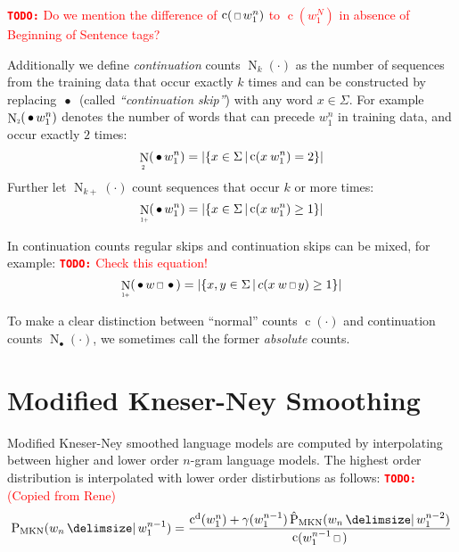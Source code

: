 \documentclass[m,bachelor,binding]{WeSTthesis}
\newcommand*{\Scale}[2][4]{\scalebox{#1}{$#2$}}%
\newcommand{\DummyArg}{\cdot}
\newcommand{\DummyIndex}{\bullet}
\newcommand{\Cardinality}[1]{\left|#1\right|}
\DeclareMathOperator{\Count}{c}
\DeclareMathOperator{\ContCount}{N}
\newcommand{\ContCountIp}  {\ContCount_{\Scale[0.5]{1+}}}
\newcommand{\ContCountII}  {\ContCount_{\Scale[0.5]{2 }}}
\newcommand{\Skp}{\ensuremath{\,\Scale[0.7]{\square}\,}}
\newcommand{\WSkp}{\ensuremath{\,\bullet\,}}
\newenvironment{draft}{\color{draftcolor}}{}
\newcommand{\todo}[1]{\textcolor{red}{{\footnotesize\textbf{\texttt{TODO:}}} #1}}
\begin{document}
\todo{Do we mention the difference of $\Count(\Skp w_1^n)$ to $\Count(w_1^N)$
in absence of Beginning of Sentence tags?}

Additionally we define \emph{continuation} counts $\ContCount_k(\DummyArg)$ as
the number of sequences from the training data that occur exactly $k$ times and
can be constructed by replacing $\WSkp$ (called \emph{``continuation skip''})
with any word $x \in \Sigma$.
For example $\ContCountII(\WSkp w_1^n)$ denotes the number of words that can
precede $w_1^n$ in training data, and occur exactly $2$ times:
\begin{equation}
  \ContCountII(\WSkp w_1^n) =
    \Cardinality{\left\{ x \in \Sigma \,\middle|\, \Count(x \: w_1^n) = 2 \right\}}
\end{equation}
Further let $\ContCount_{k+}(\DummyArg)$ count sequences that occur $k$ or more
times:
\begin{equation}
  \ContCountIp(\WSkp w_1^n) =
    \Cardinality{\left\{ x \in \Sigma \,\middle|\, \Count(x \: w_1^n) \geq 1 \right\}}
\end{equation}

In continuation counts regular skips and continuation skips can be mixed, for
example:
\todo{Check this equation!}
\begin{equation}
  \ContCountIp(\WSkp w \Skp \WSkp) =
    \Cardinality{\left\{ x, y \in \Sigma \,\middle|\, c(x \: w \Skp y) \geq 1 \right\}}
\end{equation}

To make a clear distinction between ``normal'' counts $\Count(\DummyArg)$ and
continuation counts $\ContCount_{\DummyIndex}(\DummyArg)$, we
sometimes call the former \emph{absolute} counts.

\section{Modified Kneser-Ney Smoothing}
\label{sec:review-lm-mkn}

\begin{draft}
Modified Kneser-Ney smoothed language models are computed by interpolating
between higher and lower order $n$-gram language models.
The highest order distribution is interpolated with lower order distirbutions
as follows:
\todo{(Copied from Rene)}
\end{draft}
\begin{equation}
  \label{eq:mkn-high}
  \ProbMKN{w_n}{w_1^{n-1}} =
    \frac{\DiscountedCount(w_1^n) + \gamma(w_1^{n-1}) \ProbMKN*{w_n}{w_1^{n-2}}}
         {\Count(w_1^{n-1} \Skp)} \\
\end{equation}
\end{document}
